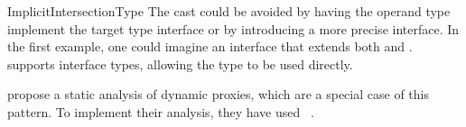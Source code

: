 \begin{pattern}{ImplicitIntersectionType}
\issues{}
The cast could be avoided by having the operand type implement the target type
interface or by introducing a more precise interface.
In the first example,
one could imagine an interface  that extends both
 and .
\scala{} supports interface types,
allowing the type  to be used directly.

\cite{fourtounisStaticAnalysisJava2018} propose a static analysis of dynamic proxies,
which are a special case of this pattern.
To implement their analysis,
they have used \doop{}~\citep{bravenboerExceptionAnalysisPointsto}.

\end{pattern}
